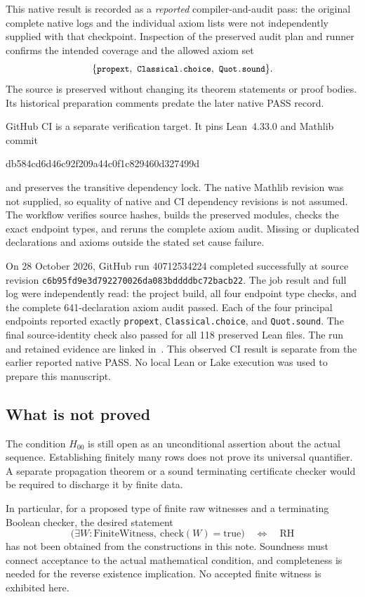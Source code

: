 \documentclass[11pt,a4paper]{article}
\theoremstyle{definition}
\numberwithin{equation}{section}
\newcommand{\RH}{\mathrm{RH}}
\newcommand{\code}[1]{\texttt{\small #1}}
\begin{document}
This native result is recorded as a \emph{reported} compiler-and-audit
pass: the original complete native logs and the individual axiom lists
were not independently supplied with that checkpoint. Inspection of the
preserved audit plan and runner confirms the intended coverage and the
allowed axiom set
\[
 \{\code{propext},\ \code{Classical.choice},\ \code{Quot.sound}\}.
\]
The source is preserved without changing its theorem statements or proof
bodies. Its historical preparation comments predate the later native
PASS record.

GitHub CI is a separate verification target. It pins Lean~4.33.0 and
Mathlib commit
\begin{center}\small\ttfamily
db584cd6d46c92f209a44c0f1c829460d327499d
\end{center}
and preserves the transitive dependency lock. The native Mathlib
revision was not supplied, so equality of native and CI dependency
revisions is not assumed. The workflow verifies source hashes, builds
the preserved modules, checks the exact endpoint types, and reruns the
complete axiom audit. Missing or duplicated declarations and axioms
outside the stated set cause failure.

On 28 October 2026, GitHub run 40712534224 completed successfully at
source revision \code{c6b95fd9e3d792270026da083bddddbc72bacb22}.
The job result and full log were independently read: the project build,
all four endpoint type checks, and the complete 641-declaration axiom
audit passed. Each of the four principal endpoints reported exactly
\code{propext}, \code{Classical.choice}, and \code{Quot.sound}.
The final source-identity check also passed for all 118 preserved Lean
files. The run and retained evidence are linked in~\cite{cirun}.
This observed CI result is separate from the earlier reported native
PASS. No local Lean or Lake execution was used to prepare this manuscript.

\subsection{What is not proved}
The condition $H_{00}$ is still open as an unconditional assertion about
the actual sequence. Establishing finitely many rows does not prove its
universal quantifier. A separate propagation theorem or a sound
terminating certificate checker would be required to discharge it by
finite data.

In particular, for a proposed type of finite raw witnesses and a
terminating Boolean checker, the desired statement
\[
 \bigl(\exists W:\mathrm{FiniteWitness},\ 
                 \mathrm{check}(W)=\mathrm{true}\bigr)
       \quad\Longleftrightarrow\quad\RH
\]
has not been obtained from the constructions in this note. Soundness
must connect acceptance to the actual mathematical condition, and
completeness is needed for the reverse existence implication. No
accepted finite witness is exhibited here.
\end{document}
